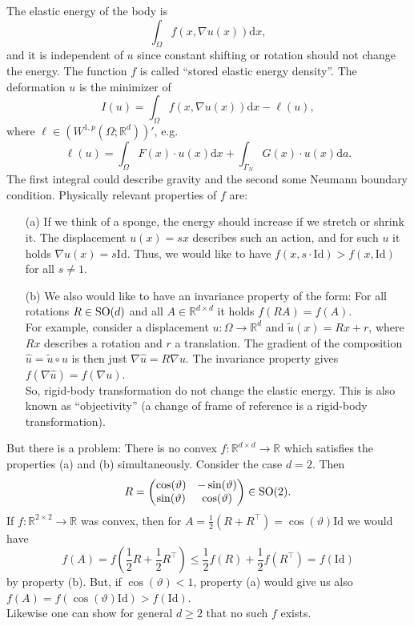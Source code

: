The elastic energy of the body is
\[\int_\Omega{f(x,\nabla u(x))\mathrm{d}x},\]
and it is independent of $u$ since constant shifting or rotation should not change the energy. The function $f$ is called ``stored elastic energy density''. The deformation $u$ is the minimizer of
\[I(u)=\int_\Omega{f(x,\nabla u(x))\mathrm{d}x}-\ell(u),\]
where $\ell\in(W^{1,p}(\Omega;\mathbb{R}^d))'$, e.g.
\[\ell(u)=\int_\Omega{F(x)\cdot u(x)\mathrm{d}x}+\int_{\Gamma_N}{G(x)\cdot u(x)\mathrm{d}a}.\]
The first integral could describe gravity and the second some Neumann boundary condition. Physically relevant properties of $f$ are:
\begin{itemize}
	\item[(a)] If we think of a sponge, the energy should increase if we stretch or shrink it. The displacement $u(x)=sx$ describes such an action, and for such $u$ it holds $\nabla u(x)=s\mathrm{Id}$. Thus, we would like to have $f(x,s\cdot\mathrm{Id})>f(x,\mathrm{Id})$ for all $s\ne1$.
	\item[(b)] We also would like to have an invariance property of the form: For all rotations $R\in\operatorname{SO}\mathopen{}\left(d\right)\mathclose{}$ and all $A\in\mathbb{R}^{d\times d}$ it holds $f(RA)=f(A)$.\\

	For example, consider a displacement $u:\Omega\longrightarrow\mathbb{R}^d$ and $\widetilde{u}(x)=Rx+r$, where $Rx$ describes a rotation and $r$ a translation. The gradient of the composition $\widehat{u}=\widetilde{u}\circ u$ is then just $\nabla\widehat{u}=R\nabla u$. The invariance property gives $f(\nabla\widehat{u})=f(\nabla u)$.\\

	So, rigid-body transformation do not change the elastic energy. This is also known as ``objectivity'' (a change of frame of reference is a rigid-body transformation).
\end{itemize}
But there is a problem: There is no convex $f:\mathbb{R}^{d\times d}\longrightarrow\mathbb{R}$ which satisfies the properties (a) and (b) simultaneously. Consider the case $d=2$. Then
\[R=\begin{pmatrix}
	\cos(\vartheta)&-\sin(\vartheta)\\
	\sin(\vartheta)&\cos(\vartheta)
\end{pmatrix}\in\operatorname{SO}\mathopen{}\left(2\right)\mathclose{}.\]
If $f:\mathbb{R}^{2\times 2}\longrightarrow\mathbb{R}$ was convex, then for $A=\frac{1}{2}(R+R^\top)=\cos(\vartheta)\mathrm{Id}$ we would have
\[f(A)=f\left(\frac{1}{2}R+\frac{1}{2}R^\top\right)\leq\frac{1}{2}f(R)+\frac{1}{2}f(R^\top)=f(\mathrm{Id})\]
by property (b). But, if $\cos(\vartheta)<1$, property (a) would give us also $f(A)=f(\cos(\vartheta)\mathrm{Id})>f(\mathrm{Id})$.\\

Likewise one can show for general $d\geq2$ that no such $f$ exists.